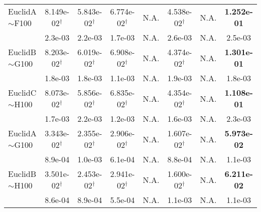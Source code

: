 {\begin{longtable}[c]{lccccccc}
    EuclidA$\sim$F100      & 8.149e-02$^{\dag}$ & 5.843e-02$^{\dag}$ & 6.774e-02$^{\dag}$ & N.A.               & 4.538e-02$^{\dag}$ & N.A.              & \textbf{1.252e-01} \\
                                            & 2.3e-03            & 2.2e-03            & 1.7e-03            & N.A.               & 2.6e-03            & N.A.            & 2.5e-03            \\
    \midrule
    EuclidB$\sim$G100        & 8.203e-02$^{\dag}$ & 6.019e-02$^{\dag}$ & 6.908e-02$^{\dag}$ & N.A.               & 4.374e-02$^{\dag}$ & N.A.              & \textbf{1.301e-01} \\
                                            & 1.8e-03            & 1.8e-03            & 1.1e-03            & N.A.               & 1.9e-03            & N.A.            & 1.8e-03            \\
    \midrule
    EuclidC$\sim$H100       & 8.073e-02$^{\dag}$ & 5.856e-02$^{\dag}$ & 6.835e-02$^{\dag}$ & N.A.               & 4.354e-02$^{\dag}$ & N.A.             & \textbf{1.108e-01} \\
                                            & 1.7e-03            & 2.2e-03            & 1.2e-03            & N.A.               & 1.6e-03            & N.A.            & 2.3e-03            \\
    \midrule

    EuclidA$\sim$G100      & 3.343e-02$^{\dag}$ & 2.355e-02$^{\dag}$ & 2.906e-02$^{\dag}$ & N.A.               & 1.607e-02$^{\dag}$ & N.A.             & \textbf{5.973e-02} \\
                                            & 8.9e-04            & 1.0e-03            & 6.1e-04            & N.A.               & 8.8e-04            & N.A.            & 1.1e-03            \\
    \midrule
    EuclidB$\sim$H100       & 3.501e-02$^{\dag}$ & 2.453e-02$^{\dag}$ & 2.941e-02$^{\dag}$ & N.A.               & 1.600e-02$^{\dag}$ & N.A.             & \textbf{6.211e-02} \\
                                            & 8.6e-04            & 8.9e-04            & 5.5e-04            & N.A.               & 1.1e-03            & N.A.            & 1.1e-03            \\


\end{longtable}}
